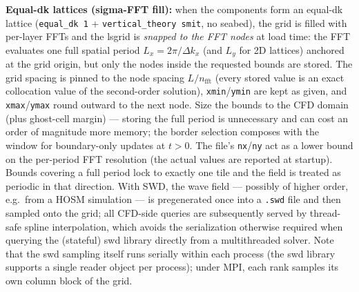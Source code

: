 \textbf{Equal-dk lattices (sigma-FFT fill):} when the components form an
equal-dk lattice (\texttt{equal\_dk 1} + \texttt{vertical\_theory smit},
no seabed), the grid is filled with per-layer FFTs and the lsgrid is
\emph{snapped to the FFT nodes} at load time: the FFT evaluates one full
spatial period $L_x = 2\pi/\Delta k_x$ (and $L_y$ for 2D lattices)
anchored at the grid origin, but only the nodes inside the requested
bounds are stored. The grid spacing is pinned to the node spacing
$L/n_\mathrm{fft}$ (every stored value is an exact collocation value of
the second-order solution), \texttt{xmin}/\texttt{ymin} are kept as
given, and \texttt{xmax}/\texttt{ymax} round outward to the next node.
Size the bounds to the CFD domain (plus ghost-cell margin) --- storing
the full period is unnecessary and can cost an order of magnitude more
memory; the border selection composes with the window for
boundary-only updates at $t > 0$. The file's \texttt{nx}/\texttt{ny} act
as a lower bound on the per-period FFT resolution (the actual values are
reported at startup). Bounds covering a full period lock to exactly one
tile and the field is treated as periodic in that direction. With SWD, the wave field --- possibly of higher order, e.g.\ from a HOSM simulation --- is pregenerated once into a \texttt{.swd} file and then sampled onto the grid; all CFD-side queries are subsequently served by thread-safe spline interpolation, which avoids the serialization otherwise required when querying the (stateful) swd library directly from a multithreaded solver. Note that the swd sampling itself runs serially within each process (the swd library supports a single reader object per process); under MPI, each rank samples its own column block of the grid.


